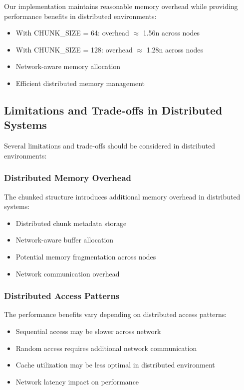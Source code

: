 Our implementation maintains reasonable memory overhead while providing performance benefits in distributed environments:
\begin{itemize}
    \item With CHUNK\_SIZE = 64: overhead $\approx$ 1.56n across nodes
    \item With CHUNK\_SIZE = 128: overhead $\approx$ 1.28n across nodes
    \item Network-aware memory allocation
    \item Efficient distributed memory management
\end{itemize}

\subsection{Limitations and Trade-offs in Distributed Systems}

Several limitations and trade-offs should be considered in distributed environments:

\subsubsection{Distributed Memory Overhead}
The chunked structure introduces additional memory overhead in distributed systems:
\begin{itemize}
    \item Distributed chunk metadata storage
    \item Network-aware buffer allocation
    \item Potential memory fragmentation across nodes
    \item Network communication overhead
\end{itemize}

\subsubsection{Distributed Access Patterns}
The performance benefits vary depending on distributed access patterns:
\begin{itemize}
    \item Sequential access may be slower across network
    \item Random access requires additional network communication
    \item Cache utilization may be less optimal in distributed environment
    \item Network latency impact on performance
\end{itemize}

